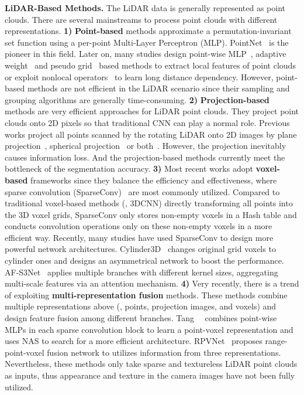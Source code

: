 \documentclass[runningheads]{llncs}
\begin{document}
	\noindent\textbf{LiDAR-Based Methods. }
The LiDAR data is generally represented as point clouds. There are several mainstreams to process point clouds with different representations.
\textbf{1)} \textbf{Point-based} methods approximate a permutation-invariant set function using a per-point Multi-Layer Perceptron (MLP). PointNet~\cite{qi2017pointnet} is the pioneer in this field. 
Later on, many studies design point-wise MLP~\cite{qi2017pointnet++,wang2019dynamic}, adaptive weight~\cite{PointConv,liu2019relation} and pseudo grid~\cite{Thomas_2019_ICCV,hua2018pointwise} based methods to extract local features of point clouds or exploit nonlocal operators~\cite{yan2020pointasnl,zhao2021point,engel2021point} to learn long distance dependency.
However, point-based methods are not efficient in the LiDAR scenario since their sampling and grouping algorithms are generally time-consuming. 
\textbf{2)} \textbf{Projection-based} methods are very efficient approaches for LiDAR point clouds. They project point clouds onto 2D pixels so that traditional CNN can play a normal role. Previous works project all points scanned by the rotating LiDAR onto 2D images by plane projection~\cite{lawin2017deep, boulch2017unstructured, tatarchenko2018tangent}, spherical projection~\cite{wu2018squeezeseg,wu2019squeezesegv2} or both~\cite{liong2020amvnet}.
However, the projection inevitably causes information loss. And the projection-based methods currently meet the bottleneck of the segmentation accuracy.
\textbf{3)} Most recent works adopt \textbf{voxel-based} frameworks since they balance the efficiency and effectiveness, where sparse convolution (SparseConv)~\cite{SparseConv} are most commonly  utilized.
Compared to traditional voxel-based methods (\ie, 3DCNN) directly transforming all points into the 3D voxel grids, SparseConv only stores non-empty voxels in a Hash table and conducts convolution operations only on these non-empty voxels in a more efficient way. 
Recently, many studies have used SparseConv to design more powerful network architectures. 
Cylinder3D~\cite{zhou2020cylinder3d} changes original grid voxels to cylinder ones and designs an asymmetrical network to boost the performance.
AF-S3Net~\cite{cheng20212} applies multiple branches with different kernel sizes, aggregating multi-scale features via an attention mechanism.
\textbf{4)} Very recently, there is a trend of exploiting \textbf{multi-representation fusion} methods. 
These methods combine multiple representations above (\ie, points, projection images, and voxels) and design feature fusion among different branches.
Tang~\etal~\cite{tang2020searching} combines point-wise MLPs in each sparse convolution block to learn a point-voxel representation and uses NAS to search for a more efficient architecture.
RPVNet~\cite{xu2021rpvnet} proposes range-point-voxel fusion network to utilizes information from three representations.
Nevertheless, these methods only take sparse and textureless LiDAR point clouds as inputs, thus appearance and texture in the camera images have not been fully utilized.
	
\end{document}
